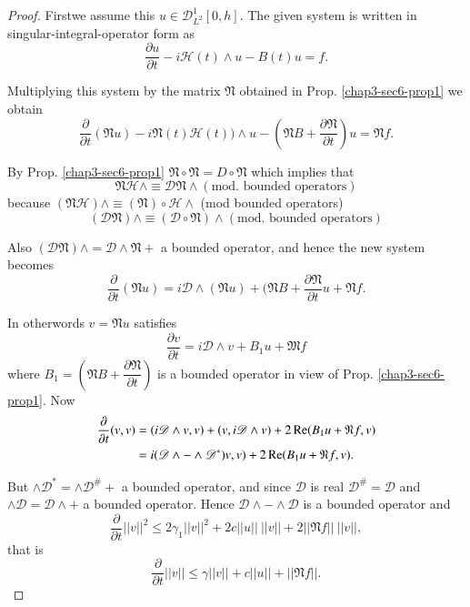 \begin{proof}
First\pageoriginale we assume this $u \in
\mathscr{D}^1_{L^2}[0, h]$. The given system is written in
singular-integral-operator form as   
\begin{equation*}
\frac{\partial u}{\partial t} - i \mathscr{H} (t) \wedge u - B(t) u =  
f. \tag{6.7} \label{chap3-eq6.7}
\end{equation*}

Multiplying this system by the matrix $\mathfrak{N}$ obtained in
Prop. \ref{chap3-sec6-prop1} we obtain  
$$
\frac{\partial}{\partial t} (\mathfrak{N} u) - i \mathfrak{N} (t) 
\mathscr{H}(t)) \wedge u - (\mathfrak{N} B + \frac{\partial
  \mathfrak{N}}{\partial t}) u = \mathfrak{N} f.  
$$

By Prop. \ref{chap3-sec6-prop1} $\mathfrak{N} \circ \mathfrak{N} = D
\circ \mathfrak{N}$ which  implies that   
$$
\mathfrak{N} \mathscr{H} \wedge \equiv \mathscr{D} \mathfrak{N}
\wedge (\text{mod. bounded operators}) 
$$
because $(\mathfrak{N} \mathscr{H}) \wedge \equiv (\mathfrak{N}) \circ
\mathscr{H} \wedge$  (mod bounded operators)  
$$
(\mathscr{D} \mathfrak{N}) \wedge \equiv (\mathscr{D} \circ \mathfrak{N})
\wedge (\text{mod. bounded operators}) 
$$

Also $(\mathscr{D} \mathfrak{N}) \wedge = \mathscr{D} \wedge
\mathfrak{N} +  $ a bounded operator, and hence the new system becomes   
$$
\frac{\partial}{\partial t} (\mathfrak{N} u)= i \mathscr{D} \wedge
(\mathfrak{N} u) + (\mathfrak{N} B + \frac{\partial
  \mathfrak{N}}{\partial t} u + \mathfrak{N} f.  
$$

In otherwords $v = \mathfrak{N} u $ satisfies 
$$
\frac{\partial v}{\partial t} = i \mathscr{D} \wedge v + B_1 u +
\mathfrak{M} f 
$$
where $B_1 = \left(\mathfrak{N} B + \dfrac{\partial \mathfrak{N}}{\partial
  t}\right)$ is a bounded operator in view of
Prop. \ref{chap3-sec6-prop1}. Now   
\begin{align*}
\frac{\partial}{\partial t}(v, v) & = (i \mathscr{D} \wedge v, v) +
(v, i \mathscr{D} \wedge v) + 2 \operatorname{Re} (B_1 u + \mathfrak{N} f, v)\\ 
& = i ( \mathscr{D} \wedge  - \wedge\mathscr{D}^\ast) v,v) + 2 \operatorname{Re} (B_1
u + \mathfrak{N} f, v).  
\end{align*}
 
But $\wedge \mathscr{D}^* =  \wedge \mathscr{D}^{\#} + $ a bounded
operator, and since $\mathscr{D}$ is real $\mathscr{D}^{\#} =
\mathscr{D}$ and\pageoriginale $\wedge \mathscr{D} = \mathscr{D}\wedge
+$ a bounded operator. Hence $\mathscr{D}\wedge - \wedge
\mathscr{D}$ is a bounded operator and   
$$
\frac{\partial}{\partial t}||v||^2 \leq 2 \gamma_1  ||v||^2 + 2c
||u|| ~||v||+2 ||\mathfrak{N} f||~ ||v||, 
$$
that is 
$$
\frac{\partial}{\partial t}||v|| \leq \gamma ||v|| +c ||u||+||
\mathfrak{N} f||.  
$$


\end{proof}
